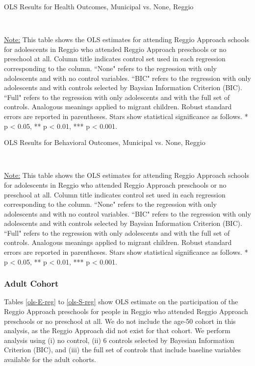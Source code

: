 \begin{table}[H] \caption{OLS Results for Health Outcomes, Municipal vs. None, Reggio} \label{ols-H-adol-reg}

\vspace{1ex} \\
\footnotesize\raggedright{\underline{Note:} This table shows the OLS estimates for attending Reggio Approach schools for adolescents in Reggio who attended Reggio Approach preschools or no preschool at all. Column title indicates control set used in each regression corresponding to the column. ``None" refers to the regression with only adolescents and with no control variables. ``BIC" refers to the regression with only adolescents and with controls selected by Baysian Information Criterion (BIC). ``Full" refers to the regression with only adolescents and with the full set of controls. Analogous meanings applied to migrant children. Robust standard errors are reported in parentheses. Stars show statistical significance as follows. * p < 0.05, ** p < 0.01, *** p < 0.001.}
\end{table}

\begin{table}[H] \caption{OLS Results for Behavioral Outcomes, Municipal vs. None, Reggio} \label{ols-B-adol-reg}

\vspace{1ex} \\
\footnotesize\raggedright{\underline{Note:} This table shows the OLS estimates for attending Reggio Approach schools for adolescents in Reggio who attended Reggio Approach preschools or no preschool at all. Column title indicates control set used in each regression corresponding to the column. ``None" refers to the regression with only adolescents and with no control variables. ``BIC" refers to the regression with only adolescents and with controls selected by Baysian Information Criterion (BIC). ``Full" refers to the regression with only adolescents and with the full set of controls. Analogous meanings applied to migrant children. Robust standard errors are reported in parentheses. Stars show statistical significance as follows. * p < 0.05, ** p < 0.01, *** p < 0.001.}
\end{table}




\subsubsection{Adult Cohort}
Tables \ref{ols-E-reg} to \ref{ols-S-reg} show OLS estimate on the participation of the Reggio Approach preschools for people in Reggio who attended Reggio Approach preschools or no preschool at all. We do not include the age-50 cohort in this analysis, as the Reggio Approach did not exist for that cohort. We perform analysis using (i) no control, (ii) 6 controls selected by Bayesian Information Criterion (BIC), and (iii) the full set of controls that include baseline variables available for the adult cohorts. 

